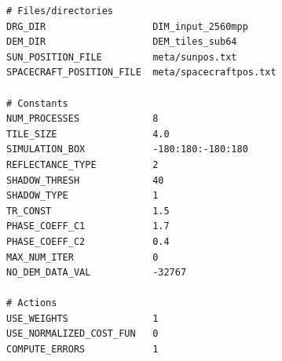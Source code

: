 \documentclass[letterpaper,fleqn,11pt]{report}
\begin{document}
\begin{verbatim}
# Files/directories
DRG_DIR                   DIM_input_2560mpp
DEM_DIR                   DEM_tiles_sub64
SUN_POSITION_FILE         meta/sunpos.txt 
SPACECRAFT_POSITION_FILE  meta/spacecraftpos.txt

# Constants
NUM_PROCESSES             8
TILE_SIZE                 4.0
SIMULATION_BOX            -180:180:-180:180
REFLECTANCE_TYPE          2
SHADOW_THRESH             40
SHADOW_TYPE               1
TR_CONST                  1.5
PHASE_COEFF_C1            1.7
PHASE_COEFF_C2            0.4
MAX_NUM_ITER              0
NO_DEM_DATA_VAL           -32767

# Actions
USE_WEIGHTS               1
USE_NORMALIZED_COST_FUN   0
COMPUTE_ERRORS            1
\end{verbatim}



\end{document}
